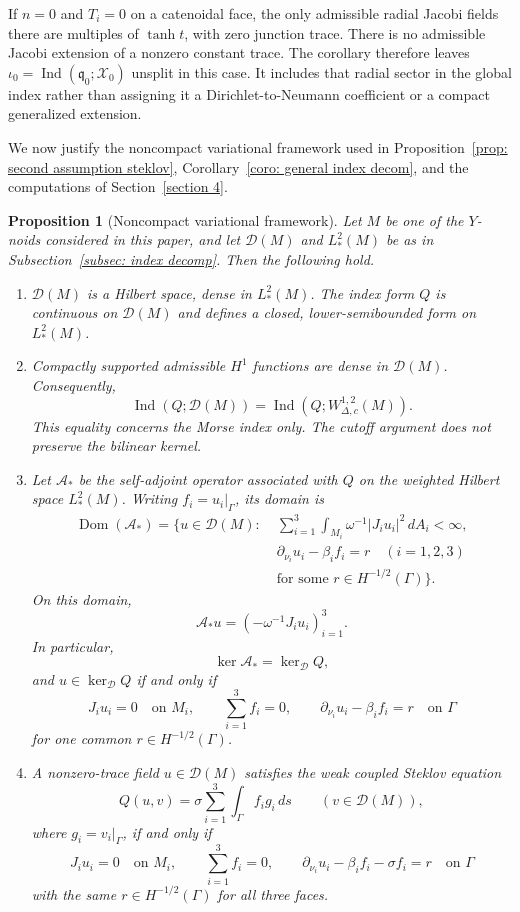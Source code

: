 \documentclass[11pt,twoside]{amsart}
\newtheorem{prop}[thm]{Proposition}
\numberwithin{equation}{section}
\begin{document}
If $n=0$ and $T_i=0$ on a catenoidal face, the only admissible radial Jacobi fields there are multiples of $\tanh t$, with zero junction trace. There is no admissible Jacobi extension of a nonzero constant trace. The corollary therefore leaves $\iota_0=\operatorname{Ind}(\mathfrak q_0;\mathcal X_0)$ unsplit in this case. It includes that radial sector in the global index rather than assigning it a Dirichlet-to-Neumann coefficient or a compact generalized extension.



We now justify the noncompact variational framework used in Proposition~\ref{prop: second assumption steklov}, Corollary~\ref{coro: general index decom}, and the computations of Section~\ref{section 4}.

\begin{prop}[Noncompact variational framework]\label{prop: function space for noncompact index}
Let $M$ be one of the $Y$-noids considered in this paper, and let $\mathcal D(M)$ and $L_*^2(M)$ be as in Subsection~\ref{subsec: index decomp}. Then the following hold.
\begin{enumerate}
\item[(a)] $\mathcal D(M)$ is a Hilbert space, dense in $L_*^2(M)$. The index form $Q$ is continuous on $\mathcal D(M)$ and defines a closed, lower-semibounded form on $L_*^2(M)$.

\item[(b)] Compactly supported admissible $H^1$ functions are dense in $\mathcal D(M)$. Consequently,
\[
\operatorname{Ind}(Q;\mathcal D(M))
=
\operatorname{Ind}(Q;W_{\Delta,c}^{1,2}(M)).
\]
This equality concerns the Morse index only. The cutoff argument does not preserve the bilinear kernel.

\item[(c)] Let $\mathscr A_*$ be the self-adjoint operator associated with $Q$ on the weighted Hilbert space $L_*^2(M)$. Writing $f_i=u_i|_\Gamma$, its domain is
\[
\begin{split}
\operatorname{Dom}(\mathscr A_*)=\biggl\{u\in\mathcal D(M):\;&
\sum_{i=1}^3\int_{M_i}\omega^{-1}|J_i u_i|^2\,dA_i<\infty,\\
&\partial_{\nu_i}u_i-\beta_i f_i=r\quad(i=1,2,3)\\
&\text{for some }r\in H^{-1/2}(\Gamma)\biggr\}.
\end{split}
\]
On this domain,
\[
\mathscr A_*u=(-\omega^{-1}J_i u_i)_{i=1}^3.
\]
In particular,
\[
\ker\mathscr A_*=\ker_{\mathcal D}Q,
\]
and $u\in\ker_{\mathcal D}Q$ if and only if
\[
J_i u_i=0\quad\text{on }M_i,\qquad
\sum_{i=1}^3 f_i=0,\qquad
\partial_{\nu_i}u_i-\beta_i f_i=r\quad\text{on }\Gamma
\]
for one common $r\in H^{-1/2}(\Gamma)$.

\item[(d)] A nonzero-trace field $u\in\mathcal D(M)$ satisfies the weak coupled Steklov equation
\[
Q(u,v)=\sigma\sum_{i=1}^3\int_\Gamma f_i g_i\,ds
\qquad(v\in\mathcal D(M)),
\]
where $g_i=v_i|_\Gamma$, if and only if
\[
J_i u_i=0\quad\text{on }M_i,\qquad
\sum_{i=1}^3f_i=0,
\qquad
\partial_{\nu_i}u_i-\beta_i f_i-\sigma f_i=r\quad\text{on }\Gamma
\]
with the same $r\in H^{-1/2}(\Gamma)$ for all three faces.
\end{enumerate}
\end{prop}
\end{document}
